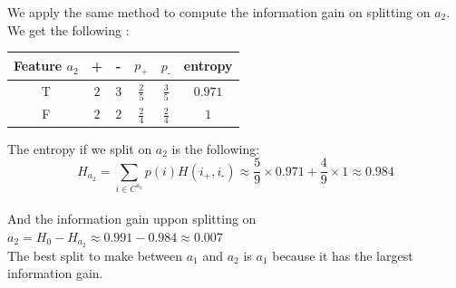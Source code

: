 \documentclass[a4paper, 10pt]{article}
\begin{document}
We apply the same method to compute the information gain on splitting on $a_2$.
\\
We get the following :
\begin{center}
    \begin{tabular}{ |c|c|c|c|c|c| }
        \hline
        Feature $a_2$ & +      & -     & $p_\text{+}$ & $p_\text{-}$ & entropy\\
        \hline
        T          & $2$    & $3$   & $\frac{2}{5}$ & $\frac{3}{5}$ & $0.971$\\
        \hline
        F          & $2$    & $2$   & $\frac{2}{4}$ & $\frac{2}{4}$ & $1$\\
        \hline
    \end{tabular}
\end{center}
The entropy if we split on $a_2$ is the following:
$$
H_{a_2} = \sum_{i \in C^{a_2}} p(i)H(i_\text{+}, i_\text{-}) \approx \frac{5}{9}\times0.971 + \frac{4}{9}\times1 \approx 0.984
$$
\\
And the information gain uppon splitting on $a_2 = H_0 -H_{a_2} \approx 0.991 -0.984 \approx 0.007$
\\
The best split to make between $a_1$ and $a_2$ is $a_1$ because it has the largest information gain.
\end{document}
